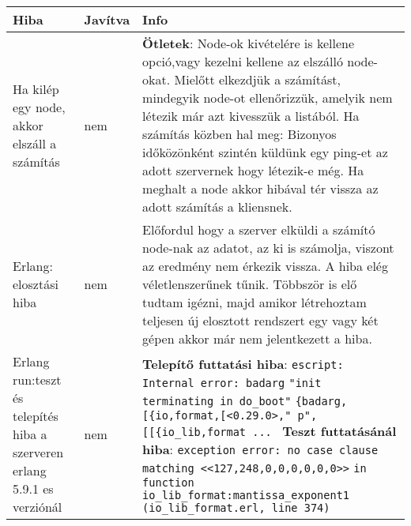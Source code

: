   	\begin{center}\begin{tabular}{| p{4cm} | p{1.5cm} | p{8cm} |}
	\hline Hiba & Javítva & Info 
    \\ \hline
        Ha kilép egy node, akkor elszáll a számítás 
      &
      	nem
      &
      \textbf{Ötletek}:
      Node-ok kivételére is kellene opció,vagy kezelni kellene az elszálló node-okat.
      \newline Mielőtt elkezdjük a számítást, mindegyik node-ot ellenőrizzük, amelyik nem létezik már azt kivesszük a listából. Ha számítás közben hal meg: Bizonyos időközönként szintén küldünk egy ping-et az adott szervernek hogy létezik-e még. Ha meghalt a node akkor hibával tér vissza az adott számítás a kliensnek.
   	\\ \hline
    	Erlang: elosztási hiba
      &
      	nem
      &
      	Előfordul hogy a szerver elküldi a számító node-nak az adatot, az ki is számolja, viszont az eredmény nem érkezik vissza.\newline
      	A hiba elég véletlenszerűnek tűnik. Többször is elő tudtam igézni, majd amikor létrehoztam teljesen új elosztott rendszert egy vagy két gépen akkor már nem jelentkezett a hiba. 
    \\ \hline
    	Erlang run:teszt és telepítés hiba a szerveren erlang 5.9.1 es verziónál
      &
      	nem
      &
      	\textbf{Telepítő futtatási hiba}: \newline
      	\texttt{escript: Internal error: badarg}
		\texttt{"init terminating in do\_boot"}
        \texttt{\{badarg,[\{io,format,[<0.29.0>,"~p",}
        \texttt{[[\{io\_lib,format ... }
		\newline \textbf{Teszt futtatásánál hiba}: \newline
		\texttt{exception error: no case clause matching <<127,248,0,0,0,0,0,0>>}
     	\texttt{in function  io\_lib\_format:mantissa\_exponent\/1}
     	\texttt{(io\_lib\_format.erl, line 374) }
    \\ \hline
  	\end{tabular}\end{center}